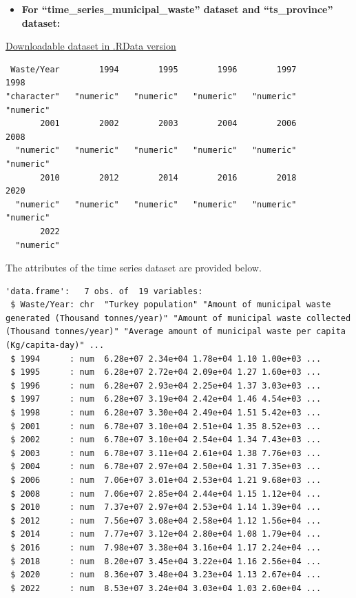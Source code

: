 \documentclass[
  11pt,
  a4paper,
  DIV=11,
  numbers=noendperiod]{scrartcl}
\providecommand{\tightlist}{%
  \setlength{\itemsep}{0pt}\setlength{\parskip}{0pt}}\usepackage{longtable,booktabs,array}
\begin{document}
\begin{itemize}
\tightlist
\item
  \textbf{For ``time\_series\_municipal\_waste'' dataset and
  ``ts\_province'' dataset:}
\end{itemize}

\href{https://github.com/emu-hacettepe-analytics/emu660-spring2024-Dilara-pro/tree/main/project/data}{Downloadable
dataset in .RData version}

\begin{verbatim}
 Waste/Year        1994        1995        1996        1997        1998 
"character"   "numeric"   "numeric"   "numeric"   "numeric"   "numeric" 
       2001        2002        2003        2004        2006        2008 
  "numeric"   "numeric"   "numeric"   "numeric"   "numeric"   "numeric" 
       2010        2012        2014        2016        2018        2020 
  "numeric"   "numeric"   "numeric"   "numeric"   "numeric"   "numeric" 
       2022 
  "numeric" 
\end{verbatim}

The attributes of the time series dataset are provided below.

\begin{verbatim}
'data.frame':   7 obs. of  19 variables:
 $ Waste/Year: chr  "Turkey population" "Amount of municipal waste generated (Thousand tonnes/year)" "Amount of municipal waste collected (Thousand tonnes/year)" "Average amount of municipal waste per capita (Kg/capita-day)" ...
 $ 1994      : num  6.28e+07 2.34e+04 1.78e+04 1.10 1.00e+03 ...
 $ 1995      : num  6.28e+07 2.72e+04 2.09e+04 1.27 1.60e+03 ...
 $ 1996      : num  6.28e+07 2.93e+04 2.25e+04 1.37 3.03e+03 ...
 $ 1997      : num  6.28e+07 3.19e+04 2.42e+04 1.46 4.54e+03 ...
 $ 1998      : num  6.28e+07 3.30e+04 2.49e+04 1.51 5.42e+03 ...
 $ 2001      : num  6.78e+07 3.10e+04 2.51e+04 1.35 8.52e+03 ...
 $ 2002      : num  6.78e+07 3.10e+04 2.54e+04 1.34 7.43e+03 ...
 $ 2003      : num  6.78e+07 3.11e+04 2.61e+04 1.38 7.76e+03 ...
 $ 2004      : num  6.78e+07 2.97e+04 2.50e+04 1.31 7.35e+03 ...
 $ 2006      : num  7.06e+07 3.01e+04 2.53e+04 1.21 9.68e+03 ...
 $ 2008      : num  7.06e+07 2.85e+04 2.44e+04 1.15 1.12e+04 ...
 $ 2010      : num  7.37e+07 2.97e+04 2.53e+04 1.14 1.39e+04 ...
 $ 2012      : num  7.56e+07 3.08e+04 2.58e+04 1.12 1.56e+04 ...
 $ 2014      : num  7.77e+07 3.12e+04 2.80e+04 1.08 1.79e+04 ...
 $ 2016      : num  7.98e+07 3.38e+04 3.16e+04 1.17 2.24e+04 ...
 $ 2018      : num  8.20e+07 3.45e+04 3.22e+04 1.16 2.56e+04 ...
 $ 2020      : num  8.36e+07 3.48e+04 3.23e+04 1.13 2.67e+04 ...
 $ 2022      : num  8.53e+07 3.24e+04 3.03e+04 1.03 2.60e+04 ...
\end{verbatim}
\end{document}
